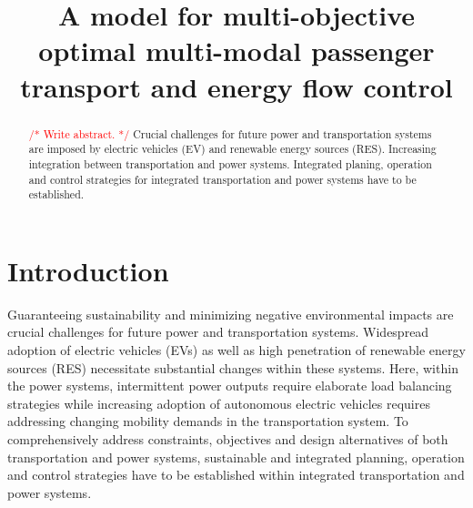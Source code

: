\documentclass[conference]{IEEEtran}
\newcommand{\todo}[1]{\textcolor{red}{/* #1 */}}
\begin{document}
	
	\title{A model for multi-objective optimal multi-modal passenger transport and energy flow control}
	
	\author{
		\and
		\and
	}

	\maketitle
	
	\begin{abstract}
		\todo{Write abstract.}
	Crucial challenges for future power and transportation systems are imposed by electric vehicles (EV) and renewable energy sources (RES).	
	Increasing integration between transportation and power systems.
	Integrated planing, operation and control strategies for integrated transportation and power systems have to be established.
		
	\end{abstract}
	
	\section{Introduction}
	
	Guaranteeing sustainability and minimizing negative environmental impacts are crucial challenges for future power and transportation systems. Widespread adoption of electric vehicles (EVs) as well as high penetration of renewable energy sources (RES) necessitate substantial changes within these systems. Here, within the power systems, intermittent power outputs require elaborate load balancing strategies while increasing adoption of autonomous electric vehicles requires addressing changing mobility demands in the transportation system. To comprehensively address constraints, objectives and design alternatives of both transportation and power systems, sustainable and integrated planning, operation and control strategies have to be established within integrated transportation and power systems.
	
\end{document}
